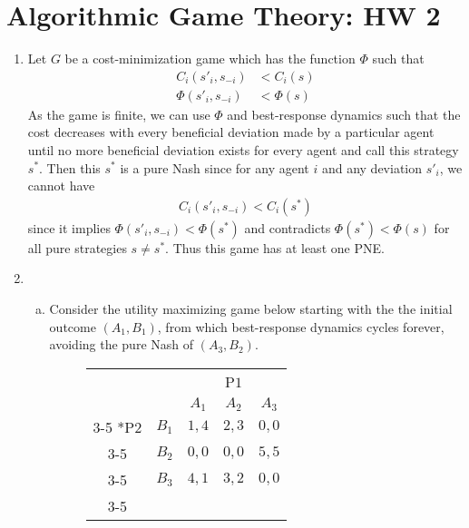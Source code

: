 \documentclass[a4paper,12pt]{article}
\theoremstyle{definition}
\begin{document}
\section*{Algorithmic Game Theory: HW 2}

\begin{enumerate}

\item
Let $G$ be a cost-minimization game which has the function $\Phi$ such that
\begin{align*}
C_i(s'_i,s_{-i})&<C_i(s)\\
\Phi(s'_i,s_{-i})&<\Phi(s)
\end{align*}
As the game is finite, we can use $\Phi$ and best-response dynamics such that the cost decreases with every beneficial deviation made by a particular agent until no more beneficial deviation exists for every agent and call this strategy $s^\ast$. Then this $s^\ast$ is a pure Nash since for any agent $i$ and any deviation $s'_i$, we cannot have
\begin{align*}
C_i(s'_i,s_{-i})<C_i(s^\ast)
\end{align*}
since it implies $\Phi(s'_i,s_{-i})<\Phi(s^\ast)$ and contradicts $\Phi(s^\ast)<\Phi(s)$ for all pure strategies $s \neq s^\ast$. Thus this game has at least one PNE.
\item
\begin{enumerate}[(a)]
\item 
Consider the utility maximizing game below starting with the the initial outcome $(A_1,B_1)$, from which best-response dynamics cycles forever, avoiding the pure Nash of $(A_3,B_2)$.
\begin{figure}[h]
\renewcommand{\arraystretch}{1.5}
    \centering
    \begin{tabular}{cc|c|c|c|}
      & \multicolumn{1}{c}{} & \multicolumn{3}{c}{P$1$}\\
      & \multicolumn{1}{c}{} & \multicolumn{1}{c}{$A_1$}  & \multicolumn{1}{c}{$A_2$} &\multicolumn{1}{c}{$A_3$}\\\cline{3-5}
      \multirow{3}*{P$2$}  & $B_1$ & $1,4$ & $2,3$& $0,0$\\\cline{3-5}
      \cline{3-5}
& $B_2$ & $0,0$ & $0,0$& $5,5$\\\cline{3-5}
      & $B_3$ & $4,1$ & $3,2$ &$0,0$\\\cline{3-5}
    \end{tabular}
 \end{figure}   


\end{enumerate}
\end{enumerate}
\end{document}

